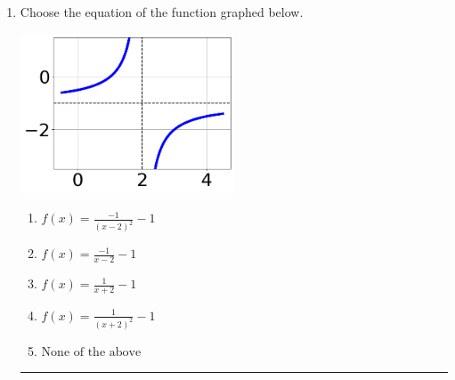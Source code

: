 \documentclass[14pt]{extbook}
\newcommand{\litem}[1]{\item#1\hspace*{-1cm}\rule{\textwidth}{0.4pt}}
\begin{document}
\begin{enumerate}
{\begin{enumerate}[label=\Alph*.]
\end{enumerate} }
\litem{
Choose the equation of the function graphed below.
\begin{center}
    \includegraphics[width=0.5\textwidth]{../Figures/rationalGraphToEquationCopyC.png}
\end{center}
\begin{enumerate}[label=\Alph*.]
\item \( f(x) = \frac{-1}{(x - 2)^2} - 1 \)
\item \( f(x) = \frac{-1}{x - 2} - 1 \)
\item \( f(x) = \frac{1}{x + 2} - 1 \)
\item \( f(x) = \frac{1}{(x + 2)^2} - 1 \)
\item \( \text{None of the above} \)


\end{enumerate}}
\end{enumerate}
\end{document}
